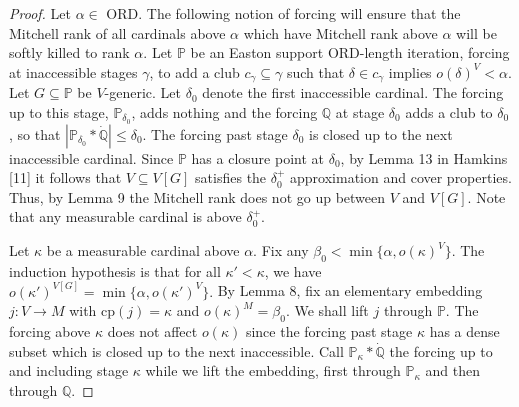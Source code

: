 \documentclass[10pt,leqno]{amsart}
\begin{document}
\begin{proof} Let $\alpha \in$ ORD. The following notion of forcing will ensure that the Mitchell rank of all cardinals above $\alpha$ which have Mitchell rank above $\alpha$ will be softly killed to rank $\alpha$. Let $\mathbb{P}$ be an Easton support ORD-length iteration, forcing at inaccessible stages $\gamma$, to add a club $c_{\gamma} \subseteq \gamma$ such that $\delta \in c_{\gamma}$ implies $o(\delta)^V < \alpha$. Let $G \subseteq \mathbb{P}$ be $V$-generic. Let $\delta_0$ denote the first inaccessible cardinal. The forcing up to this stage, $\mathbb{P}_{\delta_0}$, adds nothing and the forcing $\mathbb{Q}$ at stage $\delta_0$ adds a club to $\delta_0$, so that $|\mathbb{P}_{\delta_0} * \dot{\mathbb{Q}}| \le \delta_0$. The forcing past stage $\delta_0$ is closed up to the next inaccessible cardinal. Since $\mathbb{P}$ has a closure point at $\delta_0$, by Lemma 13 in Hamkins [11] it follows that $V \subseteq V[G]$ satisfies the $\delta_0^+$ approximation and cover properties. Thus, by Lemma 9 the Mitchell rank does not go up between $V$ and $V[G]$. Note that any measurable cardinal is above $\delta_0^+$. 

Let $\kappa$ be a measurable cardinal above $\alpha$. Fix any $\beta_0 < \min\{\alpha, o(\kappa)^V\}$. The induction hypothesis is that for all $\kappa' < \kappa$, we have $o(\kappa')^{V[G]} = \min\{ \alpha, o(\kappa')^V\}.$ By Lemma 8, fix an elementary embedding $j:V \to M$ with cp$(j) = \kappa$ and $o(\kappa)^M = \beta_0$. We shall lift $j$ through $\mathbb{P}$. The forcing above $\kappa$ does not affect $o(\kappa)$ since the forcing past stage $\kappa$ has a dense subset which is closed up to the next inaccessible. Call $\mathbb{P}_{\kappa}*\dot{\mathbb{Q}}$ the forcing up to and including stage $\kappa$ while we lift the embedding, first through $\mathbb{P}_{\kappa}$ and then through $\mathbb{Q}$. 


\end{proof}
\end{document}
